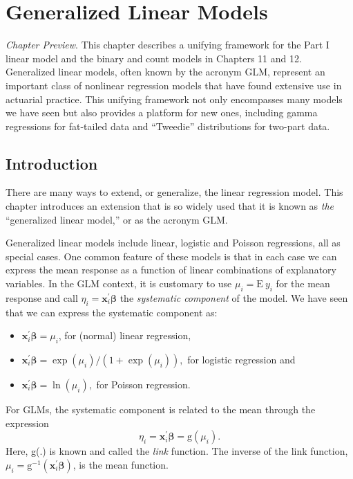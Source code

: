 \setcounter{chapter}{12}

\chapter{Generalized Linear Models}


{\small \textit{Chapter Preview}. This chapter describes a unifying
framework for the Part I linear model and the binary and count
models in Chapters 11 and 12. Generalized linear models, often known
by the acronym GLM, represent an important class of nonlinear
regression models that have found extensive use in actuarial
practice. This unifying framework not only encompasses many models
we have seen but also provides a platform for new ones, including
gamma regressions for fat-tailed data and ``Tweedie'' distributions
for two-part data.}

\section{Introduction}

There are many ways to extend, or generalize, the linear regression
model. This chapter introduces an extension that is so widely used
that it is known as \emph{the} ``generalized linear model,'' or as
the acronym GLM.


Generalized linear models include linear, logistic and Poisson
regressions, all as special cases. One common feature of these
models is that in each case we can express the mean response as a
function of linear combinations of explanatory variables. In the GLM
context, it is customary to use $\mu_i = \mathrm{E}~y_i$ for the
mean response and call  $\eta_i = \mathbf{x}_i^{\mathbf{\prime}}
\boldsymbol \beta$ the \emph{systematic component} of the model. We
have seen that we can express the systematic component as:
\begin{itemize}
  \item $\mathbf{x}_i^{\mathbf{\prime}}
\boldsymbol \beta = \mu_i$, for (normal) linear regression,
  \item $\mathbf{x}_i^{\mathbf{\prime}}
\boldsymbol \beta = \exp(\mu_i)/(1+\exp(\mu_i)),$ for logistic
regression and
  \item $\mathbf{x}_i^{\mathbf{\prime}}
\boldsymbol \beta = \ln (\mu_i),$ for Poisson regression.
\end{itemize}
For GLMs, the systematic component is related to the mean through
the expression
\begin{equation}\label{E13: Link}
\eta _i = \mathbf{x}_i^{\mathbf{\prime}} \boldsymbol \beta =
\mathrm{g}\left( \mu _i\right).
\end{equation}
Here, g(.) is known and called the \emph{link} function. The inverse
of the link function, $\mu _i = \mathrm{g}^{-1}(
\mathbf{x}_i^{\mathbf{\prime}} \boldsymbol \beta)$, is the mean
function.


